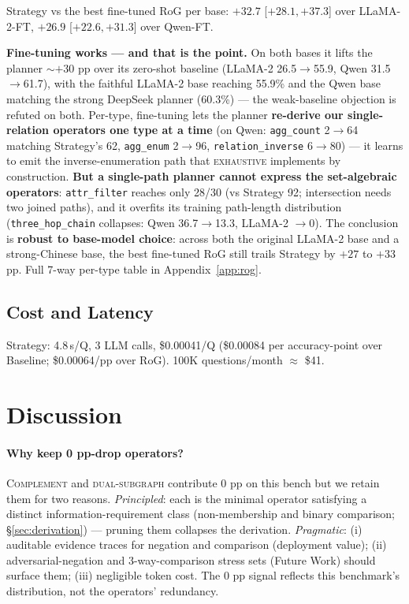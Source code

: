 \documentclass[11pt,a4paper]{article}
\newcommand{\qtype}[1]{\texttt{\small #1}}
\newcommand{\op}[1]{\textsc{\small #1}}
\begin{document}
Strategy vs the best fine-tuned RoG per base: $+32.7$ [$+28.1,+37.3$] over LLaMA-2-FT, $+26.9$ [$+22.6,+31.3$] over Qwen-FT.

\textbf{Fine-tuning works --- and that is the point.} On both bases it lifts the planner ${\sim}{+}30$ pp over its zero-shot baseline (LLaMA-2 26.5$\to$55.9, Qwen 31.5$\to$61.7), with the faithful LLaMA-2 base reaching 55.9\% and the Qwen base matching the strong DeepSeek planner (60.3\%) --- the weak-baseline objection is refuted on both. Per-type, fine-tuning lets the planner \textbf{re-derive our single-relation operators one type at a time} (on Qwen: \qtype{agg\_count} 2$\to$64 matching Strategy's 62, \qtype{agg\_enum} 2$\to$96, \qtype{relation\_inverse} 6$\to$80) --- it learns to emit the inverse-enumeration path that \op{exhaustive} implements by construction. \textbf{But a single-path planner cannot express the set-algebraic operators}: \qtype{attr\_filter} reaches only 28/30 (vs Strategy 92; intersection needs two joined paths), and it overfits its training path-length distribution (\qtype{three\_hop\_chain} collapses: Qwen 36.7$\to$13.3, LLaMA-2 $\to$0). The conclusion is \textbf{robust to base-model choice}: across both the original LLaMA-2 base and a strong-Chinese base, the best fine-tuned RoG still trails Strategy by $+27$ to $+33$ pp. Full 7-way per-type table in Appendix~\ref{app:rog}.

\subsection{Cost and Latency}
Strategy: 4.8\,s/Q, 3 LLM calls, \$0.00041/Q (\$0.00084 per accuracy-point over Baseline; \$0.00064/pp over RoG). 100K questions/month $\approx$ \$41.

\section{Discussion}
\label{sec:discussion}

\paragraph{Why keep 0 pp-drop operators?}
\op{Complement} and \op{dual-subgraph} contribute 0 pp on this bench but we retain them for two reasons. \emph{Principled}: each is the minimal operator satisfying a distinct information-requirement class (non-membership and binary comparison; §\ref{sec:derivation}) --- pruning them collapses the derivation. \emph{Pragmatic}: (i) auditable evidence traces for negation and comparison (deployment value); (ii) adversarial-negation and 3-way-comparison stress sets (Future Work) should surface them; (iii) negligible token cost. The 0 pp signal reflects this benchmark's distribution, not the operators' redundancy.
\end{document}

